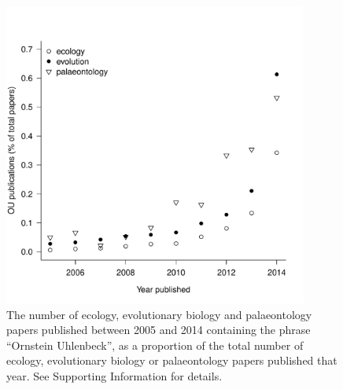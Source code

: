 \documentclass[a4paper,12pt]{article}
\begin{document}
    \begin{figure}[!htbp]
      \centering
      \includegraphics[width=10cm, height=10cm, keepaspectratio=true]{Figures/OhYou_Figure1.pdf}
      \caption{The number of ecology, evolutionary biology and palaeontology papers published between 2005 and 2014 containing the phrase ``Ornstein Uhlenbeck'', as a proportion of the total number of ecology, evolutionary biology or palaeontology papers published that year. See Supporting Information for details.
      }
      \label{figure.literature}
\end{figure}
\end{document}
